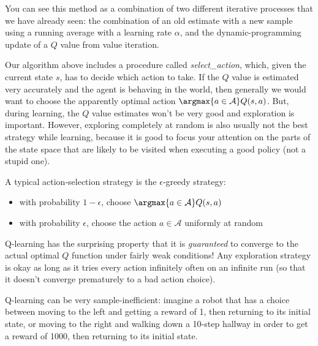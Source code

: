 You can see this method as a combination of two different iterative
processes that we have already seen:  the combination of an old
estimate with a new sample using a running average with a learning
rate $\alpha$, and the dynamic-programming update of a $Q$ value from
value iteration.


Our algorithm above includes a procedure called {\it select\_action},
which, given the current state $s$,  has to decide which action to
take.  If the $Q$ value is estimated very accurately and the agent is
behaving in the world, then generally we would want to choose the
apparently optimal action $\argmax{a \in \mathcal A} Q(s,a)$.  But, during
learning, the $Q$ value estimates won't be very good and exploration
is important.  However, exploring completely at random is also usually
not the best strategy while learning, because it is good to focus your
attention on the parts  of the state space that are likely to be
visited when executing a good policy (not a stupid one).

A typical action-selection strategy is the $\epsilon$-greedy strategy:
        \begin{itemize}
          \item with probability $1-\epsilon$, choose
            $\argmax{a \in \mathcal A} Q(s,a)$
          \item with probability $\epsilon$, choose the action $a \in \mathcal A$
            uniformly at random
        \end{itemize}


Q-learning has the surprising property that it is {\em guaranteed}
to converge to the actual optimal $Q$ function under fairly weak
conditions!  Any exploration strategy is okay as long as it tries every action
        infinitely often on an infinite run (so that it doesn't
        converge prematurely to a bad action choice).

Q-learning can be very sample-inefficient:  imagine a robot that has a
choice between moving to the left and getting a reward  of 1, then
returning to its initial state, or moving to the right and walking
down a 10-step hallway in order to get a reward of 1000, then returning
to its initial state.

\begin{center}
\end{center}

